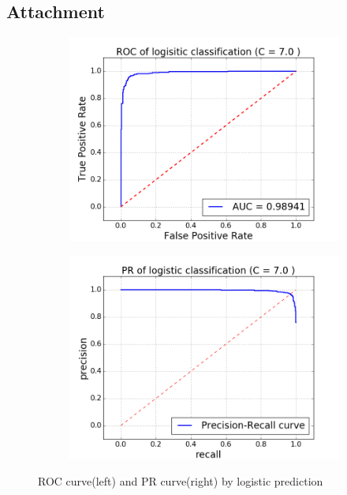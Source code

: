 \documentclass{article}
\begin{document}
\begin{singlespacing}
\newpage
\section{Attachment}

\begin{figure}[H]
    \centering
    \begin{subfigure}[b]{0.4\textwidth}
        \includegraphics[width=\textwidth]{logistic_roc.png}
    \end{subfigure}
    \begin{subfigure}[b]{0.4\textwidth}
        \includegraphics[width=\textwidth]{logistic_pr.png}
    \end{subfigure}
    \caption{ROC curve(left) and PR curve(right) by logistic prediction}\label{fig:logit}
\end{figure}


\end{singlespacing}
\end{document}
